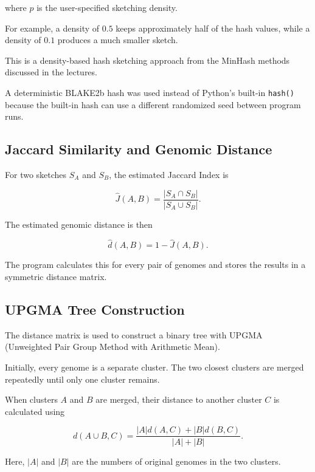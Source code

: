 \documentclass[11pt,a4paper]{article}
\begin{document}
where $p$ is the user-specified sketching density.

For example, a density of $0.5$ keeps approximately half of the hash values,
while a density of $0.1$ produces a much smaller sketch.

This is a density-based hash sketching approach from the MinHash methods
discussed in the lectures.

A deterministic BLAKE2b hash was used instead of Python's built-in
\texttt{hash()} because the built-in hash can use a different randomized seed
between program runs.

\subsection{Jaccard Similarity and Genomic Distance}

For two sketches $S_A$ and $S_B$, the estimated Jaccard Index is

\begin{equation}
\widehat{J}(A,B)
=
\frac{|S_A\cap S_B|}
{|S_A\cup S_B|}.
\end{equation}

The estimated genomic distance is then

\begin{equation}
\widehat{d}(A,B)
=
1-\widehat{J}(A,B).
\end{equation}

The program calculates this for every pair of genomes and stores the results
in a symmetric distance matrix.

\subsection{UPGMA Tree Construction}

The distance matrix is used to construct a binary tree with UPGMA
(Unweighted Pair Group Method with Arithmetic Mean).

Initially, every genome is a separate cluster. The two closest clusters are
merged repeatedly until only one cluster remains.

When clusters $A$ and $B$ are merged, their distance to another cluster $C$
is calculated using

\begin{equation}
d(A\cup B,C)
=
\frac{|A|d(A,C)+|B|d(B,C)}
{|A|+|B|}.
\end{equation}

Here, $|A|$ and $|B|$ are the numbers of original genomes in the two
clusters.
\end{document}
